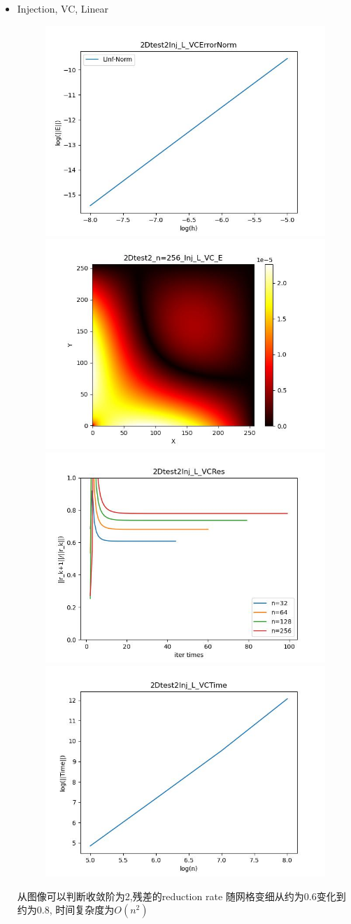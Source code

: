 \documentclass{article}
\begin{document}
\begin{itemize}
    \item Injection, VC, Linear
    \begin{figure}[h]
        \centering
        \includegraphics[width=0.35\linewidth]{2Dtest2Inj_L_VCErrorNorm.jpg}
        \includegraphics[width=0.35\linewidth]{2Dtest2_n=256_Inj_L_VC_E.jpg}
        \includegraphics[width=0.35\linewidth]{2Dtest2Inj_L_VCRes.jpg}
        \includegraphics[width=0.35\linewidth]{2Dtest2Inj_L_VCTime.jpg}
    \end{figure}
    
    从图像可以判断收敛阶为2,残差的reduction rate 随网格变细从约为0.6变化到约为0.8, 时间复杂度为$O(n^2)$
    \newpage
\end{itemize}
\end{document}
